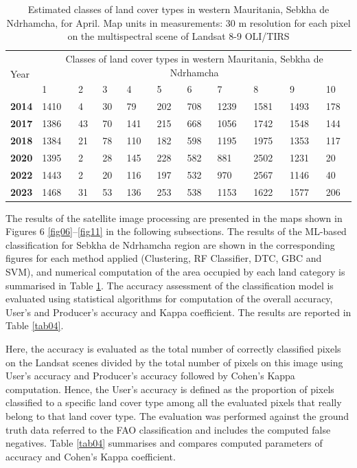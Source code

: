 \documentclass[12pt,a4paper,oneside]{article}
\def \newpar{\vspace{6pt}}
\begin{document}
\begin{table}[H]
\caption{Estimated classes of land cover types in western Mauritania, Sebkha de Ndrhamcha, for April. Map units in measurements: 30 m resolution for each pixel on the multispectral scene of Landsat 8-9 OLI/TIRS}
  \centering
  \begin{tabularx}{\textwidth}{p{0.9cm}p{0.9cm}p{0.9cm}p{0.9cm}p{0.9cm}p{0.9cm}p{0.9cm}p{0.9cm}p{0.9cm}p{0.9cm}p{0.9cm}}
  \toprule
  \multirow{2}{*}{Year} & \multicolumn{10}{c}{Classes of land cover types in western Mauritania, Sebkha de Ndrhamcha} \\
     & 1 & 2 & 3 & 4 & 5 & 6 & 7 & 8 & 9 & 10 \\
    \midrule
    \textbf{2014} & 1410 & 4 & 30 & 79 & 202 & 708 & 1239 & 1581 & 1493 & 178 \\
    
    \textbf{2017} & 1386 & 43 & 70 & 141 & 215 & 668 & 1056 & 1742 & 1548 & 144 \\
    \textbf{2018} & 1384 & 21 & 78 & 110 & 182 & 598 & 1195 & 1975 & 1353 & 117 \\
    \textbf{2020} & 1395 & 2 & 28 & 145 & 228 & 582 & 881 & 2502 & 1231 & 20 \\
    \textbf{2022} & 1443 & 2 & 20 & 116 & 197 & 532 & 970 & 2567 & 1146 & 40 \\
    \textbf{2023} & 1468 & 31 & 53 & 136 & 253 & 538 & 1153 & 1622 & 1577 & 206 \\
\bottomrule
\end{tabularx}
  \label{tab3}
\end{table}

\newpar The results of the satellite image processing are presented in the maps shown in Figures 6 \ref{fig06}--\ref{fig11} in the following subsections. The results of the ML-based classification for Sebkha de Ndrhamcha region are shown in the corresponding figures for each method applied (Clustering, RF Classifier, DTC, GBC and SVM), and numerical computation of the area occupied by each land category is summarised in Table \ref{tab3}. The accuracy assessment of the classification model is evaluated using statistical algorithms for computation of the overall accuracy, User’s and Producer’s accuracy and Kappa coefficient. The results are reported in Table \ref{tab04}.

\newpar Here, the accuracy is evaluated as the total number of correctly classified pixels on the Landsat scenes divided by the total number of pixels on this image using User’s accuracy and Producer’s accuracy followed by Cohen’s Kappa computation. Hence, the User’s accuracy is defined as the proportion of pixels classified to a specific land cover type among all the evaluated pixels that really belong to that land cover type. The evaluation was performed against the ground truth data referred to the FAO classification and includes the computed false negatives. Table \ref{tab04} summarises and compares computed parameters of accuracy and Cohen’s Kappa coefficient.
\end{document}
